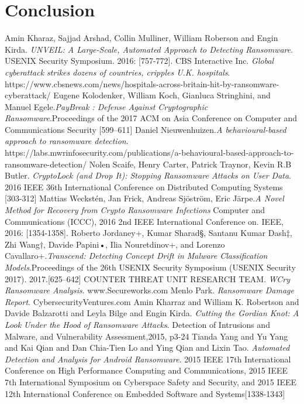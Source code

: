 \documentclass[]{PLR-ShaofengLiu}
\begin{document}
\chapter{Conclusion}


\newpage

\begin{thebibliography}{99}
 Amin Kharaz, Sajjad Arshad, Collin Mulliner, William Roberson and Engin Kirda. \emph{UNVEIL: A Large-Scale, Automated Approach
to Detecting Ransomware}. USENIX Security Symposium. 2016: [757-772].
CBS Interactive Inc. \emph{Global cyberattack strikes dozens of countries, cripples U.K. hospitals}. https://www.cbsnews.com/news/hospitals-across-britain-hit-by-ransomware-cyberattack/
Eugene Kolodenker, William Koch, Gianluca Stringhini, and Manuel Egele.\emph{PayBreak : Defense Against Cryptographic Ransomware}.Proceedings of the 2017 ACM on Asia Conference on Computer and Communications Security [599--611]
Daniel Nieuwenhuizen.\emph{A behavioural-based approach to ransomware detection}. https://labs.mwrinfosecurity.com/publications/a-behavioural-based-approach-to-ransomware-detection/
Nolen Scaife, Henry Carter, Patrick Traynor, Kevin R.B Butler. \emph{CryptoLock (and Drop It):
Stopping Ransomware Attacks on User Data}. 2016 IEEE 36th International Conference on Distributed Computing Systems [303-312] 
Mattias Weckst\'en, Jan Frick, Andreas Sj\"ostr\"om, Eric J\"arpe.\emph{A Novel Method for Recovery from Crypto Ransomware Infections }Computer and Communications (ICCC), 2016 2nd IEEE International Conference on. IEEE, 2016: [1354-1358].
Roberto Jordaney+, Kumar Sharad§, Santanu Kumar Dash‡, Zhi Wang†, Davide Papini•, Ilia Nouretdinov+, and Lorenzo Cavallaro+.\emph{Transcend: Detecting Concept Drift in Malware Classification Models}.Proceedings of the 26th USENIX Security Symposium (USENIX Security 2017). 2017.[625--642]
COUNTER THREAT UNIT RESEARCH TEAM. \emph{WCry Ransomware Analysis}. www.Secureworks.com
Menlo Park. \emph{Ransomware Damage Report}. CybersecurityVentures.com
 Amin Kharraz and William K. Robertson and Davide Balzarotti and Leyla Bilge and Engin Kirda. \emph{Cutting the Gordian Knot: A Look Under the Hood of Ransomware Attacks}. Detection of Intrusions and Malware, and Vulnerability Assessment,2015, p3-24
 Tianda Yang and Yu Yang and Kai Qian and Dan Chia-Tien Lo and Ying Qian and Lixin Tao. \emph{Automated Detection and Analysis for Android Ransomware}. 2015 IEEE 17th International Conference on High Performance Computing and Communications, 2015 IEEE 7th International Symposium on Cyberspace Safety and Security, and 2015 IEEE 12th International Conference on Embedded Software and Systems[1338-1343]

\end{thebibliography}
\end{document}
